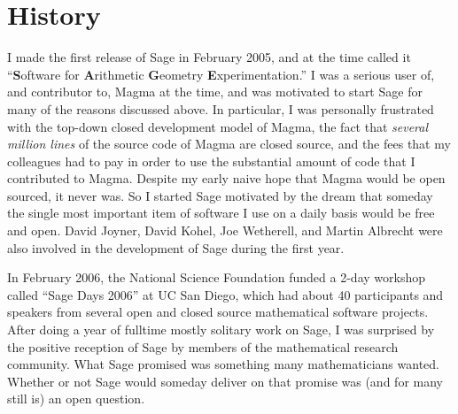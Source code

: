 \documentclass[multi]{cambridge7A}
\theoremstyle{plain}%
\theoremstyle{definition}
\begin{document}





\section{History}\label{sec:history}

I made the first release of Sage in February 2005, and at the time
called it ``{\bf S}oftware for {\bf A}rithmetic {\bf G}eometry {\bf
  E}xperimentation.''  I was a serious user of, and contributor to,
Magma at the time, and was motivated to start Sage for many of the
reasons discussed above.  In particular, I was personally frustrated
with the top-down closed development model of Magma, the fact that
{\em several million lines} of the source code of Magma are closed
source, and the fees that my colleagues had to pay in order to use the
substantial amount of code that I contributed to Magma.  Despite my
early naive hope that Magma would be open sourced, it never was.  So I
started Sage motivated by the dream that someday the single most
important item of software I use on a daily basis would be free and
open. David Joyner, David Kohel, Joe Wetherell, and Martin Albrecht
were also involved in the development of Sage during the first year.

In February 2006, the National Science Foundation funded a 2-day
workshop called ``Sage Days 2006'' at UC San Diego, which had about 40
participants and speakers from several open and closed source
mathematical software projects.  After doing a year of fulltime mostly
solitary work on Sage, I was surprised by the positive reception 
of Sage by members of the mathematical research community.  What Sage
promised was something many mathematicians wanted.  Whether or not
Sage would someday deliver on that promise was (and for many still is)
an open question.
\end{document}
